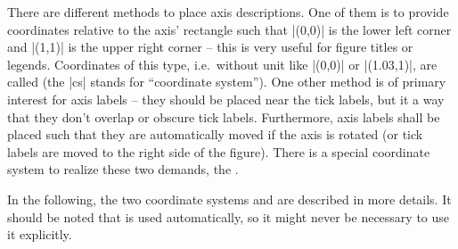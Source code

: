 There are different methods to place axis descriptions. One of them is to provide coordinates relative to the axis' rectangle such that |(0,0)| is the lower left corner and |(1,1)| is the upper right corner -- this is very useful for figure titles or legends. Coordinates of this type, i.e.\ without unit like |(0,0)| or |(1.03,1)|, are called  (the |cs| stands for ``coordinate system''). One other method is of primary interest for axis labels -- they should be placed near the tick labels, but it a way that they don't overlap or obscure tick labels. Furthermore, axis labels shall be placed such that they are automatically moved if the axis is rotated (or tick labels are moved to the right side of the figure). There is a special coordinate system to realize these two demands, the .

In the following, the two coordinate systems  and  are described in more details. It should be noted that  is used automatically, so it might never be necessary to use it explicitly.


